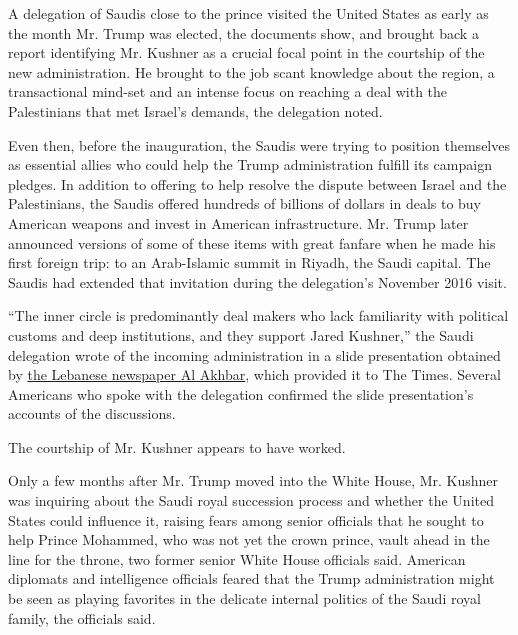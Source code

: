 A delegation of Saudis close to the prince visited the United States as
early as the month Mr. Trump was elected, the documents show, and
brought back a report identifying Mr. Kushner as a crucial focal point
in the courtship of the new administration. He brought to the job scant
knowledge about the region, a transactional mind-set and an intense
focus on reaching a deal with the Palestinians that met Israel's
demands, the delegation noted.

Even then, before the inauguration, the Saudis were trying to position
themselves as essential allies who could help the Trump administration
fulfill its campaign pledges. In addition to offering to help resolve
the dispute between Israel and the Palestinians, the Saudis offered
hundreds of billions of dollars in deals to buy American weapons and
invest in American infrastructure. Mr. Trump later announced versions of
some of these items with great fanfare when he made his first foreign
trip: to an Arab-Islamic summit in Riyadh, the Saudi capital. The Saudis
had extended that invitation during the delegation's November 2016
visit.

``The inner circle is predominantly deal makers who lack familiarity
with political customs and deep institutions, and they support Jared
Kushner,'' the Saudi delegation wrote of the incoming administration in
a slide presentation obtained by
\href{https://www.al-akhbar.com/Arab_Island/262756/\%D8\%A7\%D9\%84\%D8\%B3\%D8\%B9\%D9\%88\%D8\%AF\%D9\%8A\%D8\%A9-\%D9\%80\%D9\%80-\%D9\%84\%D9\%8A\%D9\%83\%D8\%B3-\%D8\%AA\%D8\%A3\%D8\%B1\%D9\%8A\%D8\%AE-\%D8\%B9\%D9\%84\%D8\%A7\%D9\%82\%D8\%A9-\%D8\%A7\%D8\%A8\%D9\%86-\%D8\%B3\%D9\%84\%D9\%85\%D8\%A7\%D9\%86-\%D9\%88\%D8\%AA\%D8\%B1\%D8\%A7\%D9\%85}{the
Lebanese newspaper Al Akhbar}, which provided it to The Times. Several
Americans who spoke with the delegation confirmed the slide
presentation's accounts of the discussions.

The courtship of Mr. Kushner appears to have worked.

Only a few months after Mr. Trump moved into the White House, Mr.
Kushner was inquiring about the Saudi royal succession process and
whether the United States could influence it, raising fears among senior
officials that he sought to help Prince Mohammed, who was not yet the
crown prince, vault ahead in the line for the throne, two former senior
White House officials said. American diplomats and intelligence
officials feared that the Trump administration might be seen as playing
favorites in the delicate internal politics of the Saudi royal family,
the officials said.

